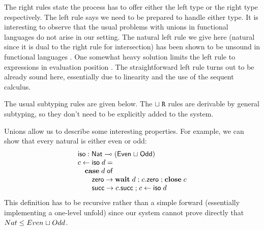 \documentclass[submission,copyright,creativecommons]{eptcs}
\renewcommand{\union}{\mathrel{\sqcup}}
\newcommand{\m}[1]{\mathsf{#1}}
\newcommand{\mb}[1]{\mbox{\bf #1}}
\newcommand{\semi}{\mathrel{;}}
\begin{document}
The right rules state the process has to offer either the left type or the right type respectively. The left rule says we need to be prepared to handle either type. It is interesting to observe that the usual problems with unions in functional languages do not arise in our setting. The natural left rule we give here (natural since it is dual to the right rule for intersection) has been shown to be unsound in functional languages \cite{Barbanera95ic}. One somewhat heavy solution limits the left rule to expressions in evaluation position \cite{DunfieldP04}. The straightforward left rule turns out to be already sound here, essentially due to linearity and the use of the sequent calculus.

The usual subtyping rules are given below. The $\union\Right$ rules are derivable by general subtyping, so they don't need to be explicitly added to the system.


Unions allow us to describe some interesting properties. For example, we can show that every natural is either even or odd:
\[
\begin{array}{l}
\m{iso} : \m{Nat} \lolli (\m{Even} \union \m{Odd}) \\
c \leftarrow \m{iso}\; d = \\
\quad \mb{case}\; d\; \m{of} \\
\qquad \m{zero} \rightarrow \mb{wait}\; d \semi c.\m{zero} \semi \mb{close}\; c \\
\qquad \m{succ} \rightarrow c.\m{succ} \semi c \leftarrow \m{iso}\; d
\end{array}
\]
This definition has to be recursive rather than a simple forward (essentially implementing a one-level unfold) since our system cannot prove directly that $Nat \sub Even \union Odd$.
\end{document}
